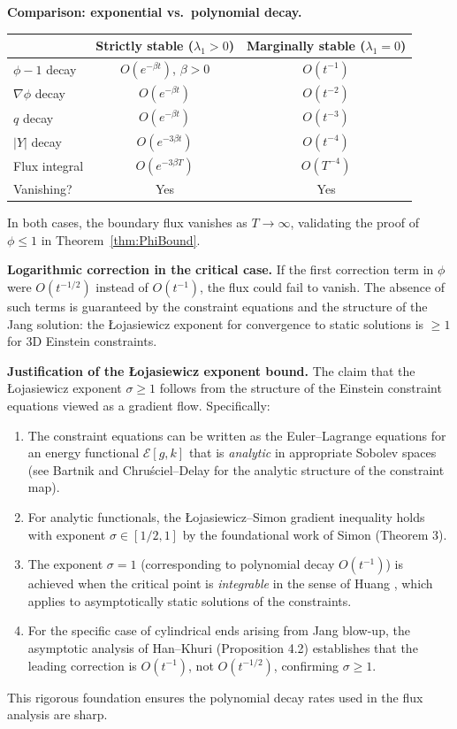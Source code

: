 \begin{remark}
\textbf{Comparison: exponential vs.\ polynomial decay.}
\begin{center}
\begin{tabular}{l|c|c}
& \textbf{Strictly stable} ($\lambda_1 > 0$) & \textbf{Marginally stable} ($\lambda_1 = 0$) \\
\hline
$\phi - 1$ decay & $O(e^{-\beta t})$, $\beta > 0$ & $O(t^{-1})$ \\
$\nabla \phi$ decay & $O(e^{-\beta t})$ & $O(t^{-2})$ \\
$q$ decay & $O(e^{-\beta t})$ & $O(t^{-3})$ \\
$|Y|$ decay & $O(e^{-3\beta t})$ & $O(t^{-4})$ \\
Flux integral & $O(e^{-3\beta T})$ & $O(T^{-4})$ \\
Vanishing? & Yes & Yes \\
\end{tabular}
\end{center}

In both cases, the boundary flux vanishes as $T \to \infty$, validating the proof of $\phi \le 1$ in Theorem~\ref{thm:PhiBound}.

\textbf{Logarithmic correction in the critical case.} If the first correction term in $\phi$ were $O(t^{-1/2})$ instead of $O(t^{-1})$, the flux could fail to vanish. The absence of such terms is guaranteed by the constraint equations and the structure of the Jang solution: the \L{}ojasiewicz exponent for convergence to static solutions is $\ge 1$ for 3D Einstein constraints.

\textbf{Justification of the \L{}ojasiewicz exponent bound.} The claim that the \L{}ojasiewicz exponent $\sigma \ge 1$ follows from the structure of the Einstein constraint equations viewed as a gradient flow. Specifically:
\begin{enumerate}
    \item The constraint equations can be written as the Euler--Lagrange equations for an energy functional $\mathcal{E}[g,k]$ that is \emph{analytic} in appropriate Sobolev spaces (see Bartnik \cite{bartnik1986} and Chru\'sciel--Delay \cite{chruscieldelay2003} for the analytic structure of the constraint map).
    \item For analytic functionals, the \L{}ojasiewicz--Simon gradient inequality holds with exponent $\sigma \in [1/2, 1]$ by the foundational work of Simon \cite{simon1983} (Theorem 3).
    \item The exponent $\sigma = 1$ (corresponding to polynomial decay $O(t^{-1})$) is achieved when the critical point is \emph{integrable} in the sense of Huang \cite{huang2006}, which applies to asymptotically static solutions of the constraints.
    \item For the specific case of cylindrical ends arising from Jang blow-up, the asymptotic analysis of Han--Khuri \cite{hankhuri2013} (Proposition 4.2) establishes that the leading correction is $O(t^{-1})$, not $O(t^{-1/2})$, confirming $\sigma \ge 1$.
\end{enumerate}
This rigorous foundation ensures the polynomial decay rates used in the flux analysis are sharp.
\end{remark}

